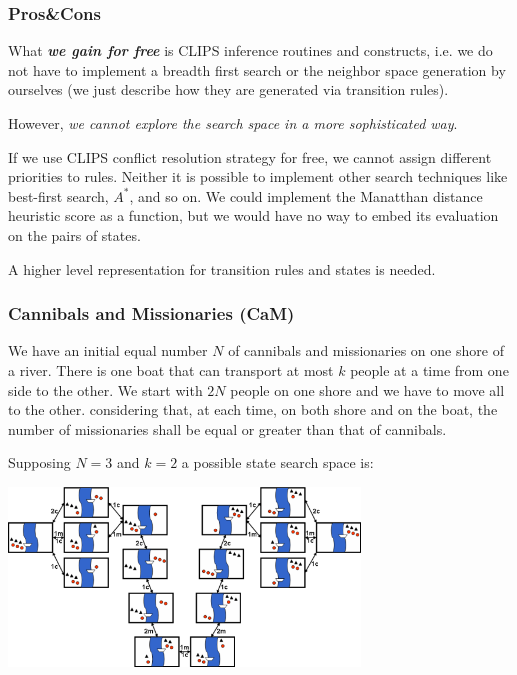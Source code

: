 \documentclass[xcolor={usenames,dvipsnames,svgnames}, compress]{beamer}
\begin{document}
\begin{frame}
  \frametitle{Pros\&Cons}
  What \textbf{\emph{we gain for free}} is CLIPS inference routines and constructs,
  i.e. we do not have to implement a breadth first search or the
  neighbor space generation by ourselves (we just describe how they are generated
  via transition rules).\par\bigskip
  
  However, \emph{we cannot explore the search space in a more sophisticated way}.\par
  
  If we use CLIPS conflict resolution strategy for free, we cannot
  assign different priorities to rules. Neither it is possible to
  implement other search techniques like best-first search, $A^{*}$,
  and so on. We could implement the Manatthan distance heuristic
  score as a function, but we would have no way to embed its
  evaluation on the pairs of states.\par\bigskip

  A higher level representation for transition rules and states is
  needed.
\end{frame}

\begin{frame}
  \frametitle{Cannibals and Missionaries (CaM)}
  We have an initial equal number $N$ of cannibals and missionaries on one
  shore of a river. There is one boat that can transport at most
  $k$ people at a time from one side to the other. We start with $2N$
  people on one shore and we have to move all to the other. considering that, at each time,
  on both shore and on the boat, the number of missionaries shall be
  equal or greater than that of cannibals.\par
  Supposing $N=3$ and $k=2$ a possible state search space is:\par\bigskip
  \begin{center}
    \includegraphics[width=0.7\textwidth]{Figures/cam}
  \end{center}

\end{frame}
\end{document}
